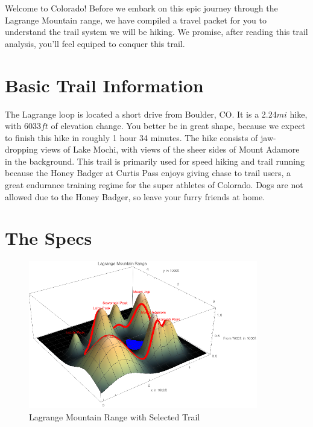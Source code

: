 \documentclass[12pt]{article}   %
\theoremstyle{definition}
\numberwithin{equation}{section}
\begin{document}
\quad Welcome to Colorado! Before we embark on this epic journey through the Lagrange Mountain range, we have compiled a travel packet for you to understand the trail system we will be hiking. We promise, after reading this trail analysis, you'll feel equiped to conquer this trail.
\newpage
\section{Basic Trail Information} \label{APPM2350proj01sec02}

\quad The Lagrange loop is located a short drive from Boulder, CO. It is a 2.24$mi$ hike, with 6033$ft$ of elevation change. You better be in great shape, because we expect to finish this hike in roughly 1 hour 34 minutes. The hike consists of jaw-dropping views of Lake Mochi, with views of the sheer sides of Mount Adamore in the background. This trail is primarily used for speed hiking and trail running because the Honey Badger at Curtis Pass enjoys giving chase to trail users, a great endurance training regime for the super athletes of Colorado. Dogs are not allowed due to the Honey Badger, so leave your furry friends at home.
\newpage
\section{The Specs}
\label{APPM2350proj01sec03}

\begin{figure} [h]
  \centering
  \includegraphics[width=10cm]{../images/lakeCorrect.png}
  \caption{Lagrange Mountain Range with Selected Trail}
  \label{fig:7humpswithtrail}
\end{figure}
\end{document}
